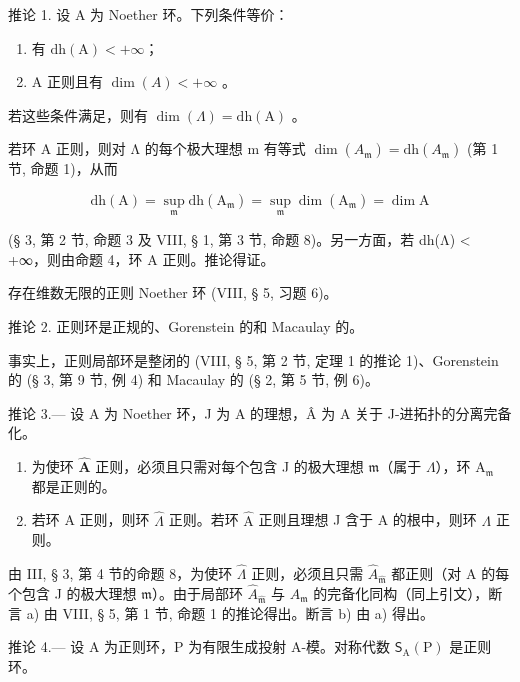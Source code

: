 推论 1. 设 A 为 Noether 环。下列条件等价：

\begin{enumerate}
\def\labelenumi{(\roman{enumi})}
\item
  有 \(\mathrm{dh(A)} < +\infty\)；
\item
  A 正则且有 \(\dim(A) < +\infty\) 。
\end{enumerate}

若这些条件满足，则有 \(\dim(\Lambda) = \mathrm{d}\mathrm{h}(\mathrm{A})\) 。

若环 A 正则，则对 Λ 的每个极大理想 m 有等式 \(\dim(A_{\mathfrak{m}}) = \mathrm{dh}(A_{\mathfrak{m}})\) (第 1 节, 命题 1)，从而

\[
\mathrm{dh} (\mathrm{A}) = \sup _ {\mathfrak {m}} \mathrm{dh} (\mathrm{A} _ {\mathfrak {m}}) = \sup _ {\mathfrak {m}} \dim (\mathrm{A} _ {\mathfrak {m}}) = \dim \mathrm{A}
\]

(§ 3, 第 2 节, 命题 3 及 VIII, § 1, 第 3 节, 命题 8)。另一方面，若 dh(Λ) \textless{} +∞，则由命题 4，环 A 正则。推论得证。

存在维数无限的正则 Noether 环 (VIII, § 5, 习题 6)。

推论 2. 正则环是正规的、Gorenstein 的和 Macaulay 的。

事实上，正则局部环是整闭的 (VIII, § 5, 第 2 节, 定理 1 的推论 1)、Gorenstein 的 (§ 3, 第 9 节, 例 4) 和 Macaulay 的 (§ 2, 第 5 节, 例 6)。

推论 3.--- 设 A 为 Noether 环，J 为 A 的理想，Â 为 A 关于 J-进拓扑的分离完备化。

\begin{enumerate}
\def\labelenumi{\alph{enumi})}
\item
  为使环 \(\widehat{\mathbf{A}}\) 正则，必须且只需对每个包含 J 的极大理想 \(\mathfrak{m}\)（属于 \(\Lambda\)），环 \(\mathrm{A}_{\mathfrak{m}}\) 都是正则的。
\item
  若环 A 正则，则环 \(\hat{\Lambda}\) 正则。若环 \(\hat{\mathrm{A}}\) 正则且理想 J 含于 A 的根中，则环 \(\Lambda\) 正则。
\end{enumerate}

由 III, § 3, 第 4 节的命题 8，为使环 \(\widehat{\Lambda}\) 正则，必须且只需 \(\widehat{A}_{\widehat{\mathfrak{m}}}\) 都正则（对 A 的每个包含 J 的极大理想 \(\mathfrak{m}\)）。由于局部环 \(\widehat{A}_{\widehat{\mathfrak{m}}}\) 与 \(A_{\mathfrak{m}}\) 的完备化同构（同上引文），断言 a) 由 VIII, § 5, 第 1 节, 命题 1 的推论得出。断言 b) 由 a) 得出。

推论 4.--- 设 A 为正则环，P 为有限生成投射 A-模。对称代数 \(\mathsf{S}_{\mathrm{A}}(\mathrm{P})\) 是正则环。

